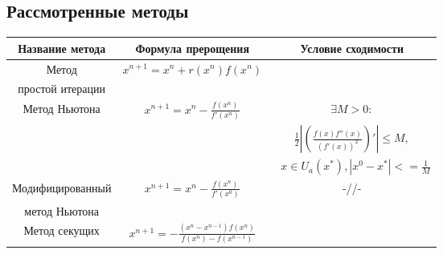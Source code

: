 \subsection{Рассмотренные методы}
\begin{table}[ht]
    \centering
    \begin{adjustbox}{\textwidth}
    \small
    \begin{tabular}{|c|c|c|}
    \hline
    \textbf{Название метода} & \textbf{Формула прерощения} & \textbf{Условие сходимости} \\
    \hline
    Метод & \begin{math} x^{n + 1} = x^n + r(x^n)f(x^n) \end{math} & \\
    простой итерации &  & \\
    \hline
    Метод Ньютона & \begin{math} x^{n + 1} = x^n - \frac{f(x^n)}{f'(x^n)} \end{math} & \begin{math} \exists M>0: \end{math} \\
    & & \begin{math} \frac{1}{2}\left|\left(\frac{f(x)f''(x)}{(f'(x))^2}\right)'\right| \leqslant M, \end{math} \\
    & & \begin{math} ~~~x \in U_a(x^*), |x^0 -x^*| <= \frac{1}{M} \end{math} \\
    \hline
    Модифицированный & \begin{math} x^{n + 1} = x^n - \frac{f(x^n)}{f'(x^0)} \end{math} & -//-\\
    метод Ньютона & & \\ 
    \hline
    Метод секущих & \begin{math} x^{n + 1} = - \frac{(x^n - x^{n - 1})f(x^n)}{f(x^n) - f(x^{n - 1})} \end{math} & \\
    \hline
    \end{tabular}
    \end{adjustbox}
    \end{table}